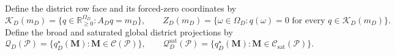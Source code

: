 Define the district row face and its forced-zero coordinates by
\[
\mathcal K_D(m_D)=\{q\in\mathbb R_{\ge0}^{\Omega_D}:A_Dq=m_D\},
\qquad
Z_D(m_D)=\{\omega\in\Omega_D:q(\omega)=0\text{ for every }q\in\mathcal K_D(m_D)\}.
\]
Define the broad and saturated global district projections by
\[
\mathcal Q_D(\mathcal P)=\{q_D^\star(\mathbf M):\mathbf M\in\mathcal C(\mathcal P)\},
\qquad
\mathcal Q_D^{\mathrm{sat}}(\mathcal P)=\{q_D^\star(\mathbf M):\mathbf M\in\mathcal C_{\mathrm{sat}}(\mathcal P)\}.
\]